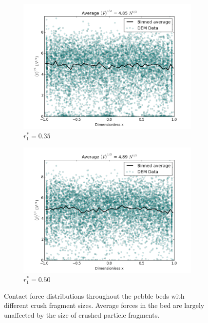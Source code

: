 \begin{figure}[!ht]
	\begin{subfigure}[b]{\doubleimagewidth}
		\centering
		\includegraphics[width=\textwidth]{chapters/figures/crush-fragments/force-scatter-35.png}
		\caption{$r_1^* = 0.35$}
	\end{subfigure}
	\begin{subfigure}[b]{\doubleimagewidth}
		\centering
		\includegraphics[width=\textwidth]{chapters/figures/crush-fragments/force-scatter-50.png}
		\caption{$r_1^* = 0.50$}
	\end{subfigure}
	\caption{Contact force distributions throughout the pebble beds with different crush fragment sizes. Average forces in the bed are largely unaffected by the size of crushed particle fragments.}
\label{fig:fragment-contact-forces}
\end{figure}


